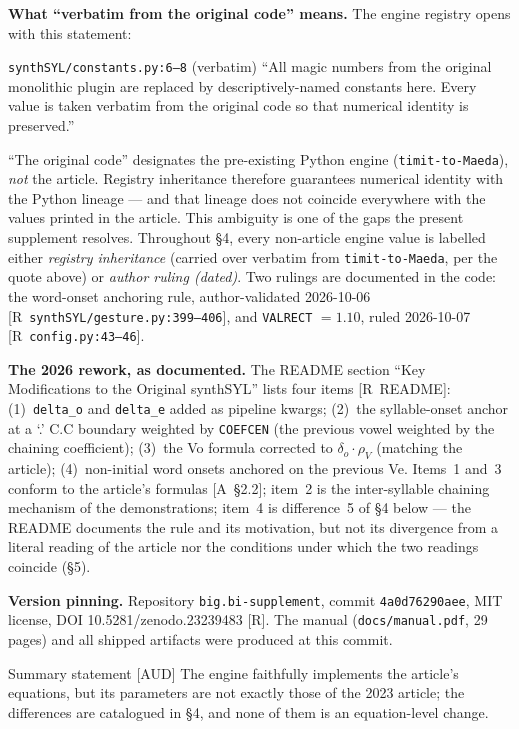 \documentclass[11pt,letterpaper]{article}
\newcommand{\code}[1]{\texttt{#1}}
\begin{document}
\textbf{What ``verbatim from the original code'' means.} The engine registry
opens with this statement:
\begin{qbox}{\code{synthSYL/constants.py:6--8} (verbatim)}
\small
``All magic numbers from the original monolithic plugin are replaced by
descriptively-named constants here. Every value is taken verbatim from the
original code so that numerical identity is preserved.''
\end{qbox}
\noindent ``The original code'' designates the pre-existing Python engine
(\code{timit-to-Maeda}), \emph{not} the article. Registry inheritance therefore
guarantees numerical identity with the Python lineage --- and that lineage does
not coincide everywhere with the values printed in the article. This
ambiguity is one of the gaps the present supplement resolves. Throughout
\S4, every non-article engine value is labelled either
\emph{registry inheritance} (carried over verbatim from
\code{timit-to-Maeda}, per the quote above) or \emph{author ruling (dated)}.
Two rulings are documented in the code: the word-onset anchoring rule,
author-validated 2026-10-06 \hbox{[R \code{synthSYL/gesture.py:399--406}]},
and \code{VALRECT} $= 1.10$, ruled 2026-10-07
\hbox{[R \code{config.py:43--46}]}.

\textbf{The 2026 rework, as documented.} The README section ``Key
Modifications to the Original synthSYL'' lists four items
\hbox{[R README]}: (1)~\code{delta\_o} and \code{delta\_e} added as pipeline
kwargs; (2)~the syllable-onset anchor at a `.' C.C boundary weighted by
\code{COEFCEN} (the previous vowel weighted by the chaining coefficient);
(3)~the Vo formula corrected to $\delta_o\cdot\rho_V$ (matching the article);
(4)~non-initial word onsets anchored on the previous Ve. Items~1 and~3 conform
to the article's formulas \hbox{[A \S2.2]}; item~2 is the inter-syllable
chaining mechanism of the demonstrations; item~4 is difference~5 of \S4 below
--- the README documents the rule and its motivation, but not its divergence
from a literal reading of the article nor the conditions under which the two
readings coincide (\S5).

\textbf{Version pinning.} Repository \code{big.bi-supplement}, commit
\code{4a0d76290aee}, MIT license, DOI 10.5281/zenodo.23239483 \hbox{[R]}.
The manual (\code{docs/manual.pdf}, 29 pages) and all shipped artifacts were
produced at this commit.

\begin{qbox}{Summary statement [AUD]}
\small
The engine faithfully implements the article's equations, but its parameters
are not exactly those of the 2023 article; the differences are catalogued in
\S4, and none of them is an equation-level change.
\end{qbox}
\end{document}
